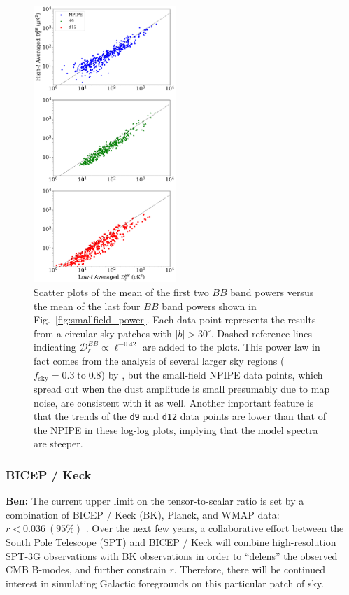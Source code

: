 \documentclass[twocolumn]{aastex631}
\begin{document}
\begin{figure}
    \centering
    \includegraphics[width=0.48\textwidth]{figures/all2_lhmean.pdf}
    \caption{Scatter plots of the mean of the first two $BB$ band powers versus the mean of the last four $BB$ band powers shown in Fig.~\ref{fig:smallfield_power}. Each data point represents the results from a circular sky patches with $|b| > 30^\circ$. Dashed reference lines indicating $\mathcal{D}_\ell^{BB} \propto \ell^{-0.42}$ are added to the plots. This power law in fact comes from the analysis of several larger sky regions ($f_\text{sky} = 0.3 \; \text{to} \; 0.8$) by \cite{planck2014-XXX}, but the small-field NPIPE data points, which spread out when the dust amplitude is small presumably due to map noise, are consistent with it as well. Another important feature is that the trends of the \texttt{d9} and \texttt{d12} data points are lower than that of the NPIPE in these log-log plots, implying that the model spectra are steeper.}
    \label{fig:smallfield_power_all}
\end{figure}

\subsubsection{BICEP / Keck} \label{sec:bkspt_spectra}

\textbf{Ben:} The current upper limit on the tensor-to-scalar ratio is set by a combination of BICEP / Keck (BK), Planck, and WMAP data: $r < 0.036~(95\%)$ \citep{Ade:2021}. Over the next few years, a collaborative effort between the South Pole Telescope (SPT) and BICEP / Keck will combine high-resolution SPT-3G observations with BK observations in order to ``delens'' the observed CMB B-modes, and further constrain $r$. Therefore, there will be continued interest in simulating Galactic foregrounds on this particular patch of sky.
\end{document}
